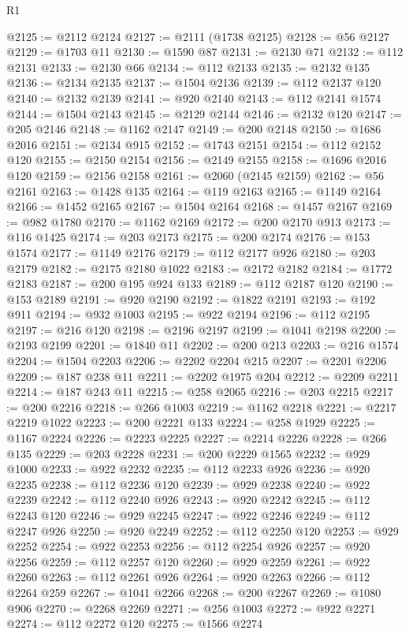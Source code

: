\begin{lexlean}{R1}
\begin{coremodule}
@2125 := @2112 @2124
@2127 := @2111 (@1738 @2125)
@2128 := @56 @2127
@2129 := @1703 @11
@2130 := @1590 @87
@2131 := @2130 @71
@2132 := @112 @2131
@2133 := @2130 @66
@2134 := @112 @2133
@2135 := @2132 @135
@2136 := @2134 @2135
@2137 := @1504 @2136
@2139 := @112 @2137 @120
@2140 := @2132 @2139
@2141 := @920 @2140
@2143 := @112 @2141 @1574
@2144 := @1504 @2143
@2145 := @2129 @2144
@2146 := @2132 @120
@2147 := @205 @2146
@2148 := @1162 @2147
@2149 := @200 @2148
@2150 := @1686 @2016
@2151 := @2134 @915
@2152 := @1743 @2151
@2154 := @112 @2152 @120
@2155 := @2150 @2154
@2156 := @2149 @2155
@2158 := @1696 @2016 @120
@2159 := @2156 @2158
@2161 := @2060 (@2145 @2159)
@2162 := @56 @2161
@2163 := @1428 @135
@2164 := @119 @2163
@2165 := @1149 @2164
@2166 := @1452 @2165
@2167 := @1504 @2164
@2168 := @1457 @2167
@2169 := @982 @1780
@2170 := @1162 @2169
@2172 := @200 @2170 @913
@2173 := @116 @1425
@2174 := @203 @2173
@2175 := @200 @2174
@2176 := @153 @1574
@2177 := @1149 @2176
@2179 := @112 @2177 @926
@2180 := @203 @2179
@2182 := @2175 @2180 @1022
@2183 := @2172 @2182
@2184 := @1772 @2183
@2187 := @200 @195 @924 @133
@2189 := @112 @2187 @120
@2190 := @153 @2189
@2191 := @920 @2190
@2192 := @1822 @2191
@2193 := @192 @911
@2194 := @932 @1003
@2195 := @922 @2194
@2196 := @112 @2195
@2197 := @216 @120
@2198 := @2196 @2197
@2199 := @1041 @2198
@2200 := @2193 @2199
@2201 := @1840 @11
@2202 := @200 @213
@2203 := @216 @1574
@2204 := @1504 @2203
@2206 := @2202 @2204 @215
@2207 := @2201 @2206
@2209 := @187 @238 @11
@2211 := @2202 @1975 @204
@2212 := @2209 @2211
@2214 := @187 @243 @11
@2215 := @258 @2065
@2216 := @203 @2215
@2217 := @200 @2216
@2218 := @266 @1003
@2219 := @1162 @2218
@2221 := @2217 @2219 @1022
@2223 := @200 @2221 @133
@2224 := @258 @1929
@2225 := @1167 @2224
@2226 := @2223 @2225
@2227 := @2214 @2226
@2228 := @266 @135
@2229 := @203 @2228
@2231 := @200 @2229 @1565
@2232 := @929 @1000
@2233 := @922 @2232
@2235 := @112 @2233 @926
@2236 := @920 @2235
@2238 := @112 @2236 @120
@2239 := @929 @2238
@2240 := @922 @2239
@2242 := @112 @2240 @926
@2243 := @920 @2242
@2245 := @112 @2243 @120
@2246 := @929 @2245
@2247 := @922 @2246
@2249 := @112 @2247 @926
@2250 := @920 @2249
@2252 := @112 @2250 @120
@2253 := @929 @2252
@2254 := @922 @2253
@2256 := @112 @2254 @926
@2257 := @920 @2256
@2259 := @112 @2257 @120
@2260 := @929 @2259
@2261 := @922 @2260
@2263 := @112 @2261 @926
@2264 := @920 @2263
@2266 := @112 @2264 @259
@2267 := @1041 @2266
@2268 := @200 @2267
@2269 := @1080 @906
@2270 := @2268 @2269
@2271 := @256 @1003
@2272 := @922 @2271
@2274 := @112 @2272 @120
@2275 := @1566 @2274

\end{coremodule}
\end{lexlean}
